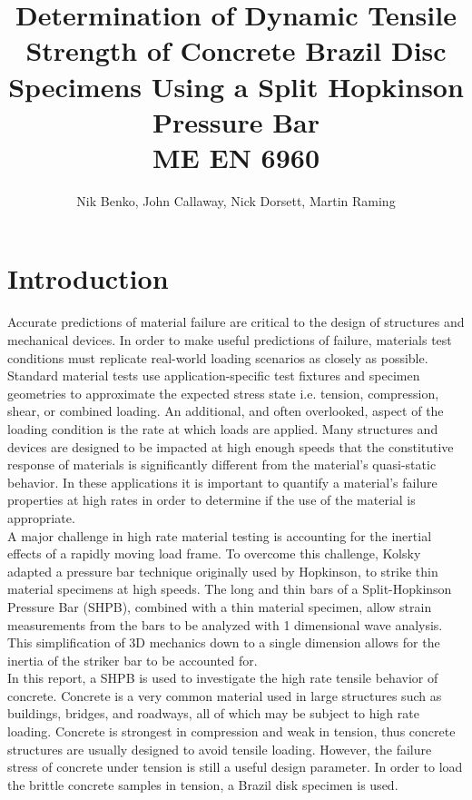 \documentclass[12pt]{article}
\begin{document}
\title{ Determination of Dynamic Tensile Strength of Concrete Brazil Disc Specimens Using a Split Hopkinson Pressure Bar  \\ \normalsize{ME EN 6960}}
\author{Nik Benko, John Callaway, Nick Dorsett, Martin Raming}
\maketitle

\begin{abstract} 

\end{abstract}

\section{Introduction} %
Accurate predictions of material failure are critical to the design of structures and mechanical devices. In order to make useful predictions of failure, materials test conditions must replicate real-world loading scenarios as closely as possible. Standard material tests use application-specific test fixtures and specimen geometries to approximate the expected stress state i.e. tension, compression, shear, or combined loading. An additional, and often overlooked, aspect of the loading condition is the rate at which loads are applied. Many structures and devices are designed to be impacted at high enough speeds that the constitutive response of materials is significantly different from the material's quasi-static behavior. In these applications it is important to quantify a material’s failure properties at high rates in order to determine if the use of the material is appropriate.  \\

A major challenge in high rate material testing is accounting for the inertial effects of a rapidly moving load frame. To overcome this challenge, Kolsky adapted a pressure bar technique originally used by Hopkinson, to strike thin material specimens at high speeds. The long and thin bars of a Split-Hopkinson Pressure Bar (SHPB), combined with a thin material specimen, allow strain measurements from the bars to be analyzed with 1 dimensional wave analysis. This simplification of 3D mechanics down to a single dimension allows for the inertia of the striker bar to be accounted for. \\

In this report, a SHPB is used to investigate the high rate tensile behavior of concrete. Concrete is a very common material used in large structures such as buildings, bridges, and roadways, all of which may be subject to high rate loading. Concrete is strongest in compression and weak in tension, thus concrete structures are usually designed to avoid tensile loading. However, the failure stress of concrete under tension is still a useful design parameter. In order to load the brittle concrete samples in tension, a Brazil disk specimen is used.  
\end{document}
